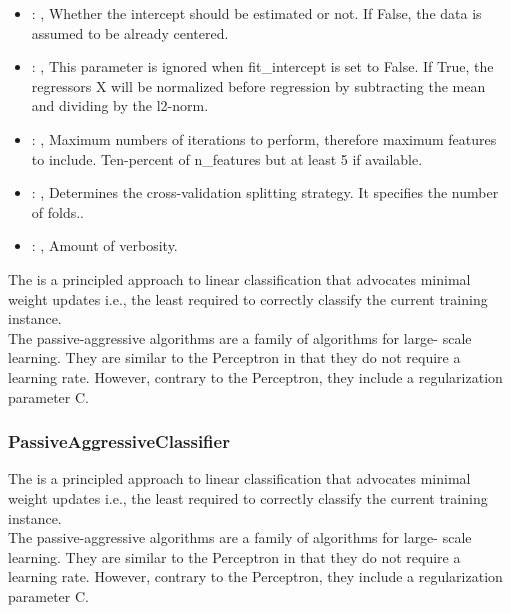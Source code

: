 \begin{itemize}
    \item {}: , 
      Whether the intercept should be estimated or not. If False,
      the data is assumed to be already centered.

    \item {}: , 
      This parameter is ignored when fit\_intercept is set to False. If True,
      the regressors X will be normalized before regression by subtracting the mean and
      dividing by the l2-norm.

    \item {}: , 
      Maximum numbers of iterations to perform, therefore maximum
      features to include. Ten-percent of n\_features but at least 5 if available.

    \item {}: , 
      Determines the cross-validation splitting strategy.
      It specifies the number of folds..

    \item {}: , 
      Amount of verbosity.
  \end{itemize}
 The                          is a principled approach to
 linear                         classification that advocates minimal weight updates i.e., the least
 required                         to correctly classify the current training instance.
 \\The passive-aggressive algorithms are a family of algorithms for                         large-
 scale learning. They are similar to the Perceptron in that they                         do not
 require a learning rate. However, contrary to the Perceptron,                         they include
 a regularization parameter C.

\subsubsection{PassiveAggressiveClassifier}
  The                          is a principled approach to
  linear                         classification that advocates minimal weight updates i.e., the
  least required                         to correctly classify the current training instance.
  \\The passive-aggressive algorithms are a family of algorithms for                         large-
  scale learning. They are similar to the Perceptron in that they                         do not
  require a learning rate. However, contrary to the Perceptron,                         they include
  a regularization parameter C.

